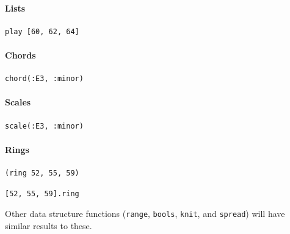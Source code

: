 \documentclass[11pt, abstracton, twoside]{scrartcl}
\begin{document}
\paragraph{Lists}
\begin{minipage}{\textwidth}
	\begin{lstlisting}[style = sonicpi]
      play [60, 62, 64]
	\end{lstlisting}
\end{minipage}

\paragraph{Chords}
\begin{minipage}{\textwidth}
	\begin{lstlisting}[style = sonicpi]
      chord(:E3, :minor)
	\end{lstlisting}
\end{minipage}

\paragraph{Scales}
\begin{minipage}{\textwidth}
	\begin{lstlisting}[style = sonicpi]
      scale(:E3, :minor)
	\end{lstlisting}
\end{minipage}

\paragraph{Rings}
\begin{minipage}{\textwidth}
	\begin{lstlisting}[style = sonicpi]
      (ring 52, 55, 59)
	\end{lstlisting}
\end{minipage}

\begin{minipage}{\textwidth}
	\begin{lstlisting}[style = sonicpi]
      [52, 55, 59].ring
	\end{lstlisting}
\end{minipage}

Other data structure functions (\texttt{range}, \texttt{bools}, \texttt{knit},
and \texttt{spread}) will have similar results to these.
\end{document}
